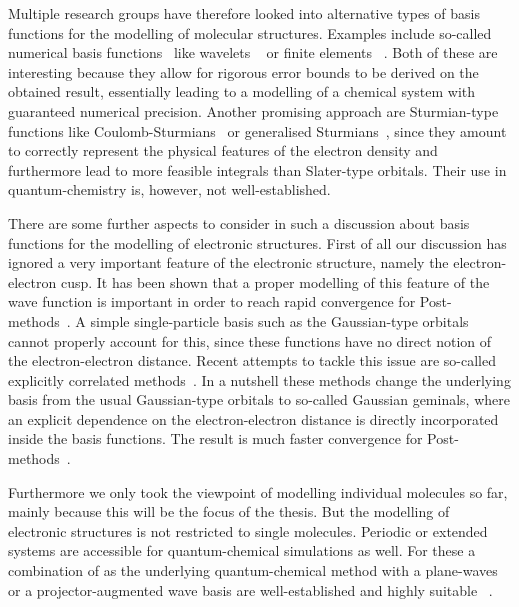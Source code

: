Multiple research groups have therefore looked
into alternative types of basis functions
for the modelling of molecular structures.
Examples include so-called numerical basis functions~\cite{Frediani2015}
like wavelets%
~\cite{Bischoff2011,Bischoff2012,Bischoff2013,Bischoff2014,Bischoff2014a,Bischoff2017}
or finite elements%
~\cite{Tsuchida1995,Soler2002,Lehtovaara2009,Alizadegan2010,Avery2011PhD,Davydov2015,Boffi2016}.
Both of these are interesting because they allow for rigorous error bounds
to be derived on the obtained result,
essentially leading to a modelling of a chemical system with guaranteed
numerical precision.
Another promising approach are Sturmian-type functions
like Coulomb-Sturmians~\cite{Shull1959,Rotenberg1962,Rotenberg1970,Gruzdev1990,Hoggan2009,Randazzo2010}
or generalised Sturmians~\cite{Avery2006,Avery2011PhD,Avery2011,Morales2016,Avery2017,Randazzo2015,Granados2016},
since they amount to correctly represent
the physical features of the electron density
and furthermore lead to more feasible integrals than Slater-type orbitals.
Their use in quantum-chemistry is, however, not well-established.

There are some further aspects to consider in such a discussion about basis functions
for the modelling of electronic structures.
First of all our discussion has ignored
a very important feature of the electronic structure,
namely the electron-electron cusp.
It has been shown that a proper modelling of this feature of the wave function
is important in order to reach rapid convergence for Post-\HF methods~\cite{Kong2012}.
A simple single-particle basis such as the Gaussian-type
orbitals cannot properly account for this,
since these functions have no direct notion of the electron-electron distance.
Recent attempts to tackle this issue are so-called
explicitly correlated methods~\cite{Kong2012}.
In a nutshell these methods change the underlying
basis from the usual Gaussian-type orbitals to so-called Gaussian geminals,
where an explicit dependence on the electron-electron
distance is directly incorporated inside the basis functions.
The result is much faster convergence for Post-\HF methods~\cite{Kong2012}.

Furthermore we only took the viewpoint of modelling
individual molecules so far, mainly because this will be the focus of the thesis.
But the modelling of electronic structures is not restricted to single molecules.
Periodic or extended systems are accessible
for quantum-chemical simulations as well.
For these a combination of \DFT as the underlying quantum-chemical method
with a plane-waves or a projector-augmented wave basis
are well-established and highly suitable%
~\cite{Kresse1996,Kresse1999,Mortensen2005,Enkovaara2010}.

